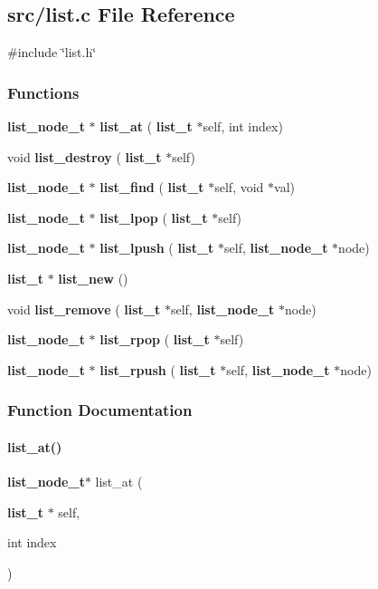 \subsection{src/list.c File Reference}
\label{list_8c}
{\ttfamily \#include \char`\"{}list.\+h\char`\"{}}\newline
\subsubsection*{Functions}
\begin{DoxyCompactItemize}
\item 
\textbf{ list\+\_\+node\+\_\+t} $\ast$ \textbf{ list\+\_\+at} (\textbf{ list\+\_\+t} $\ast$self, int index)
\item 
void \textbf{ list\+\_\+destroy} (\textbf{ list\+\_\+t} $\ast$self)
\item 
\textbf{ list\+\_\+node\+\_\+t} $\ast$ \textbf{ list\+\_\+find} (\textbf{ list\+\_\+t} $\ast$self, void $\ast$val)
\item 
\textbf{ list\+\_\+node\+\_\+t} $\ast$ \textbf{ list\+\_\+lpop} (\textbf{ list\+\_\+t} $\ast$self)
\item 
\textbf{ list\+\_\+node\+\_\+t} $\ast$ \textbf{ list\+\_\+lpush} (\textbf{ list\+\_\+t} $\ast$self, \textbf{ list\+\_\+node\+\_\+t} $\ast$node)
\item 
\textbf{ list\+\_\+t} $\ast$ \textbf{ list\+\_\+new} ()
\item 
void \textbf{ list\+\_\+remove} (\textbf{ list\+\_\+t} $\ast$self, \textbf{ list\+\_\+node\+\_\+t} $\ast$node)
\item 
\textbf{ list\+\_\+node\+\_\+t} $\ast$ \textbf{ list\+\_\+rpop} (\textbf{ list\+\_\+t} $\ast$self)
\item 
\textbf{ list\+\_\+node\+\_\+t} $\ast$ \textbf{ list\+\_\+rpush} (\textbf{ list\+\_\+t} $\ast$self, \textbf{ list\+\_\+node\+\_\+t} $\ast$node)
\end{DoxyCompactItemize}


\subsubsection{Function Documentation}
\mbox{\label{list_8c_ab3dacc64ceb63b0a0849312b0a14c91c}} 
\paragraph{list\+\_\+at()}
{\footnotesize\ttfamily \textbf{ list\+\_\+node\+\_\+t}$\ast$ list\+\_\+at (\begin{DoxyParamCaption}\item[{\textbf{ list\+\_\+t} $\ast$}]{self,  }\item[{int}]{index }\end{DoxyParamCaption})}



